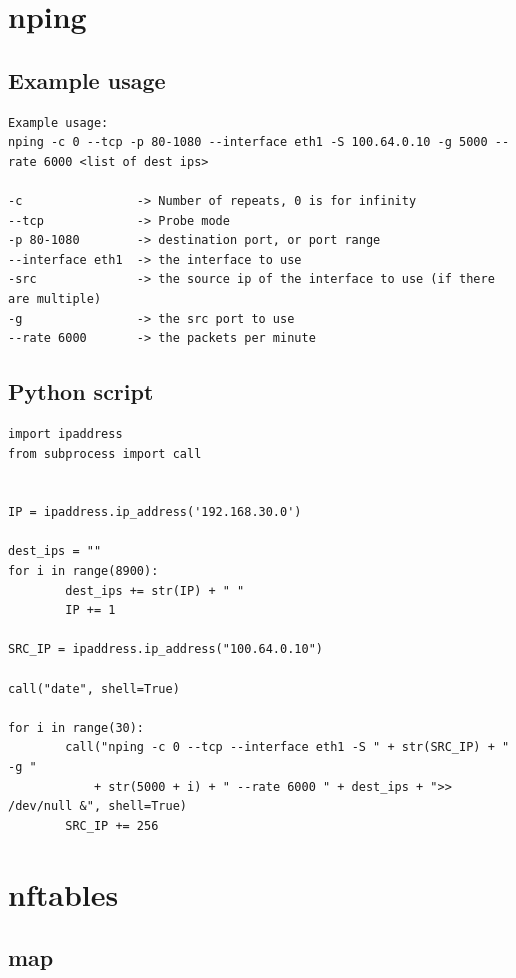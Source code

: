 \documentclass{report}
\begin{document}
\endgroup

\section{nping}\label{nping}

\subsection{Example usage}

\begingroup
\fontsize{9pt}{9pt}\selectfont
\begin{verbatim}
Example usage:
nping -c 0 --tcp -p 80-1080 --interface eth1 -S 100.64.0.10 -g 5000 --rate 6000 <list of dest ips>

-c                -> Number of repeats, 0 is for infinity
--tcp             -> Probe mode
-p 80-1080        -> destination port, or port range
--interface eth1  -> the interface to use
-src              -> the source ip of the interface to use (if there are multiple)
-g                -> the src port to use
--rate 6000       -> the packets per minute
\end{verbatim}
\endgroup
 
\subsection{Python script}

\begingroup
\fontsize{9pt}{9pt}\selectfont
\begin{verbatim}
import ipaddress
from subprocess import call


IP = ipaddress.ip_address('192.168.30.0')

dest_ips = ""
for i in range(8900):
        dest_ips += str(IP) + " "
        IP += 1

SRC_IP = ipaddress.ip_address("100.64.0.10")

call("date", shell=True)

for i in range(30):
        call("nping -c 0 --tcp --interface eth1 -S " + str(SRC_IP) + " -g " 
        	+ str(5000 + i) + " --rate 6000 " + dest_ips + ">> /dev/null &", shell=True)
        SRC_IP += 256
\end{verbatim}
\endgroup

\section{nftables}\label{nftables-1}

\subsection{map}
\end{document}
